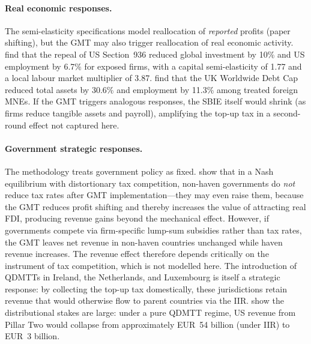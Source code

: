 \documentclass[11pt,a4paper]{article}
\begin{document}
\paragraph{Real economic responses.} The semi-elasticity specifications model reallocation of \emph{reported} profits (paper shifting), but the GMT may also trigger reallocation of real economic activity. \citet{suarezserrato2019} find that the repeal of US Section~936 reduced global investment by 10\% and US employment by 6.7\% for exposed firms, with a capital semi-elasticity of 1.77 and a local labour market multiplier of 3.87. \citet{bilicka2022} find that the UK Worldwide Debt Cap reduced total assets by 30.6\% and employment by 11.3\% among treated foreign MNEs. If the GMT triggers analogous responses, the SBIE itself would shrink (as firms reduce tangible assets and payroll), amplifying the top-up tax in a second-round effect not captured here.

\paragraph{Government strategic responses.} The methodology treats government policy as fixed. \citet{janeba2023} show that in a Nash equilibrium with distortionary tax competition, non-haven governments do \emph{not} reduce tax rates after GMT implementation---they may even raise them, because the GMT reduces profit shifting and thereby increases the value of attracting real FDI, producing revenue gains beyond the mechanical effect. However, if governments compete via firm-specific lump-sum subsidies rather than tax rates, the GMT leaves net revenue in non-haven countries unchanged while haven revenue increases. The revenue effect therefore depends critically on the instrument of tax competition, which is not modelled here. The introduction of QDMTTs in Ireland, the Netherlands, and Luxembourg is itself a strategic response: by collecting the top-up tax domestically, these jurisdictions retain revenue that would otherwise flow to parent countries via the IIR. \citet{barake2022} show the distributional stakes are large: under a pure QDMTT regime, US revenue from Pillar Two would collapse from approximately EUR~54 billion (under IIR) to EUR~3 billion.
\end{document}
